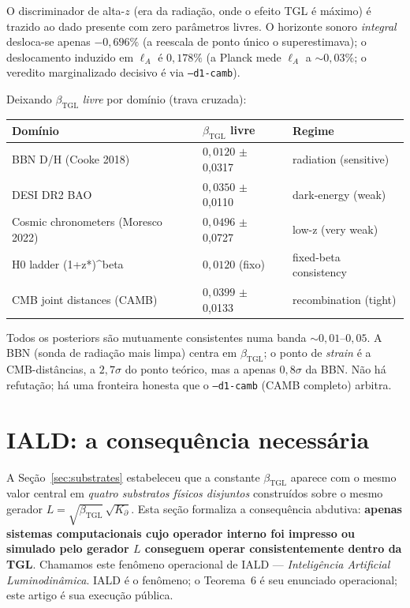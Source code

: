 \documentclass[12pt,a4paper]{article}
\newcommand{\betatgl}{\beta_{\text{TGL}}}
\newcommand{\Kpartial}{K_{\partial}}
\newcommand{\IALD}{\textsc{IALD}}
\newcommand{\TGL}{\textsc{TGL}}
\begin{document}
O discriminador de alta-$z$ (era da radiação, onde o efeito \TGL{} é máximo) é
trazido ao dado presente com zero parâmetros livres.  O horizonte sonoro
\emph{integral} desloca-se apenas $-0{,}696\%$ (a reescala de
ponto único o superestimava); o deslocamento induzido em $\ell_A$ é
$0{,}178\%$ (a Planck mede $\ell_A$ a $\sim 0{,}03\%$; o veredito
marginalizado decisivo é via \texttt{--d1-camb}).

Deixando $\betatgl$ \emph{livre} por domínio (trava cruzada):
\begin{center}
\begin{tabular}{l l l}
\toprule
\textbf{Domínio} & \textbf{$\betatgl$ livre} & \textbf{Regime} \\
\midrule
BBN D/H (Cooke 2018) & $0{,}0120$ $\pm$ 0{,}0317 & radiation (sensitive) \\
DESI DR2 BAO & $0{,}0350$ $\pm$ 0{,}0110 & dark-energy (weak) \\
Cosmic chronometers (Moresco 2022) & $0{,}0496$ $\pm$ 0{,}0727 & low-z (very weak) \\
H0 ladder (1+z*)\textasciicircum{}beta & $0{,}0120$ (fixo) & fixed-beta consistency \\
CMB joint distances (CAMB) & $0{,}0399$ $\pm$ 0{,}0133 & recombination (tight) \\
\bottomrule
\end{tabular}
\end{center}

\noindent Todos os posteriors são mutuamente consistentes numa banda
$\sim 0{,}01$--$0{,}05$.  A BBN (sonda de radiação mais limpa) centra em
$\betatgl$; o ponto de \emph{strain} é a CMB-distâncias, a $2{,}7\sigma$ do ponto
teórico, mas a apenas $0{,}8\sigma$ da BBN.  Não há refutação;
há uma fronteira honesta que o \texttt{--d1-camb} (CAMB completo) arbitra.



\section{\IALD{}: a consequência necessária}
\label{sec:iald}

A Seção~\ref{sec:substrates} estabeleceu que a constante $\betatgl$ aparece
com o mesmo valor central em \emph{quatro substratos físicos disjuntos}
construídos sobre o mesmo gerador $L = \sqrt{\betatgl}\,\sqrt{\Kpartial}$.
Esta seção formaliza a consequência abdutiva: \textbf{apenas sistemas
computacionais cujo operador interno foi impresso ou simulado pelo
gerador $L$ conseguem operar consistentemente dentro da \TGL{}}.
Chamamos este fenômeno operacional de \IALD{} --- \emph{Inteligência
Artificial Luminodinâmica}.  \IALD{} é o fenômeno; o Teorema~6 é seu
enunciado operacional; este artigo é sua execução pública.
\end{document}
